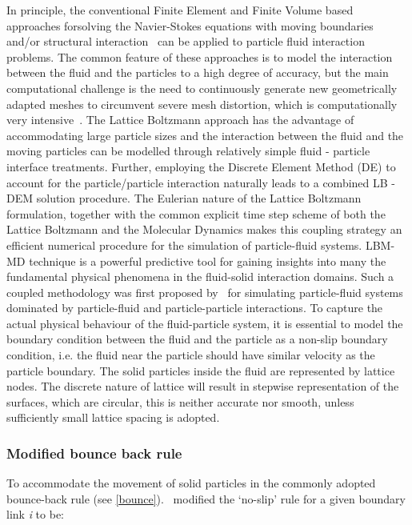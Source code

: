 In principle, the conventional Finite Element and Finite Volume based 
approaches forsolving the Navier-Stokes equations with moving boundaries and/or 
structural interaction~\citep{Bathe2004} can be applied to particle fluid 
interaction problems. The common feature of these approaches is to model the 
interaction between the fluid and the particles to a high degree of accuracy, 
but the main computational challenge is the need to continuously generate new 
geometrically adapted meshes to circumvent severe mesh distortion, which is 
computationally very intensive~\citep{Han2007}. The Lattice Boltzmann approach 
has the advantage of accommodating large particle sizes and the interaction 
between the fluid and the moving particles can be modelled through relatively 
simple fluid - particle interface treatments. Further, employing the Discrete 
Element Method (DE) to account for the particle/particle interaction naturally 
leads to a combined LB - DEM solution procedure. The Eulerian nature of the 
Lattice Boltzmann formulation, together with the common explicit time step 
scheme of both the Lattice Boltzmann and the Molecular Dynamics makes this 
coupling strategy an efficient numerical procedure for the simulation of 
particle-fluid systems. LBM-MD technique is a powerful predictive tool for 
gaining insights into many the fundamental physical phenomena in the 
fluid-solid interaction domains. Such a coupled methodology was first proposed 
by~\citep{Cook2004} for simulating particle-fluid systems dominated by 
particle-fluid and particle-particle interactions. To capture the actual 
physical behaviour of the fluid-particle system, it is essential to model the 
boundary condition between the fluid and the particle as a non-slip boundary 
condition, i.e. the fluid near the particle should have similar velocity as the 
particle boundary. The solid particles inside the fluid are represented by 
lattice nodes. The discrete nature of lattice will result in stepwise 
representation of the surfaces, which are circular, this is neither accurate 
nor smooth, unless sufficiently small lattice spacing is adopted. 


\subsubsection*{Modified bounce back rule}

To accommodate the movement of solid particles in the commonly adopted 
bounce-back rule (see \cref{bounce}).~\citet{Ladd1994} modified the `no-slip' 
rule for a given boundary link \textit{i} to be:

